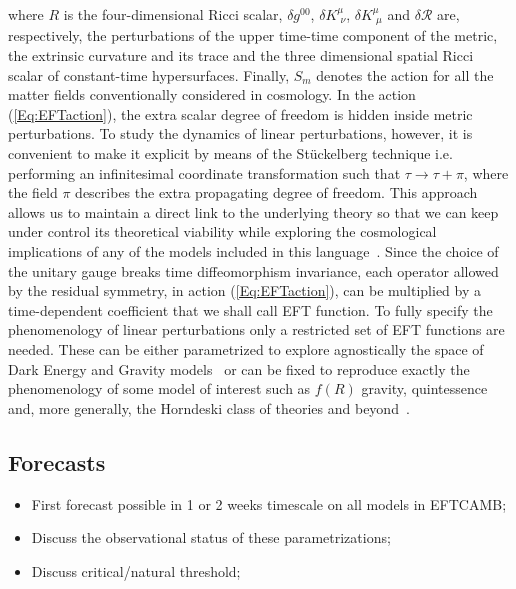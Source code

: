 where $R$ is the four-dimensional Ricci scalar, $\delta g^{00}$, $\delta K{^\mu_{\,\,\nu}}$, $\delta K{^\mu_{\,\,\mu}}$ and  $\delta \mathcal{R}$ are, respectively, the perturbations of the upper time-time component of the metric, the extrinsic curvature and its trace and the three dimensional spatial Ricci scalar of constant-time hypersurfaces. Finally,  $S_m$ denotes the action for all the matter fields conventionally considered in cosmology. In the action (\ref{Eq:EFTaction}), the  extra scalar degree of freedom is hidden inside metric perturbations. To study the dynamics of linear perturbations, however, it is convenient to make it explicit by means of  the St\"{u}ckelberg technique i.e. performing an infinitesimal coordinate transformation such that $\tau\rightarrow \tau+\pi$, where the field $\pi$ describes the extra propagating degree of freedom. This approach allows us to maintain a direct link to the underlying theory so that we can keep under control its theoretical viability while exploring the cosmological implications of any of the models included in this language~\cite{Raveri:2014cka}. Since the choice of the unitary gauge breaks time diffeomorphism invariance, each operator allowed by the residual symmetry, in action (\ref{Eq:EFTaction}), can be multiplied by a time-dependent coefficient that we shall call EFT function. To fully specify the phenomenology of linear perturbations only a restricted set of EFT functions are needed. These can be either parametrized to explore agnostically the space of Dark Energy and Gravity models~\cite{Gleyzes:2013ooa,Bloomfield:2013efa,Piazza:2013coa,Gleyzes:2014rba} or can be fixed to reproduce exactly the phenomenology of some model of interest such as $f(R)$ gravity, quintessence and, more generally, the Horndeski class of theories and beyond~\cite{Gleyzes:2014dya,Frusciante:2015maa,Frusciante:2016xoj}.
%
\subsection{Forecasts}

\begin{itemize}
\item First forecast possible in 1 or 2 weeks timescale on all models in EFTCAMB;
\item Discuss the observational status of these parametrizations;
\item Discuss critical/natural threshold;
\end{itemize}
%



